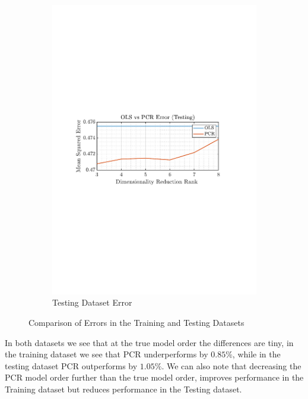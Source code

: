 \documentclass[12pt]{article}
\numberwithin{equation}{section}
\begin{document}
\begin{figure}[H]
\begin{subfigure}{0.49\textwidth}
		 			\includegraphics[trim={2.2cm 11.2cm 3.15cm  11.2cm}, clip, width=\textwidth]{../MATLAB/figures/q1_6c_fig02.pdf} 
		 			\captionsetup{justification=centering}
		 			\caption{Testing Dataset Error}
		 		\end{subfigure}
		 		\captionsetup{justification=centering}
		 		\caption{Comparison of Errors in the Training and Testing Datasets}
		 		\label{fig: 1-6c}
		 	\end{figure}
		 
		 	In both datasets we see that at the true model order the differences are tiny, in the training dataset we see that PCR underperforms by $0.85\%$, while in the testing dataset PCR outperforms by $1.05\%$. We can also note that decreasing the PCR model order further than the true model order, improves performance in the Training dataset but reduces performance in the Testing dataset.
		
\end{document}
